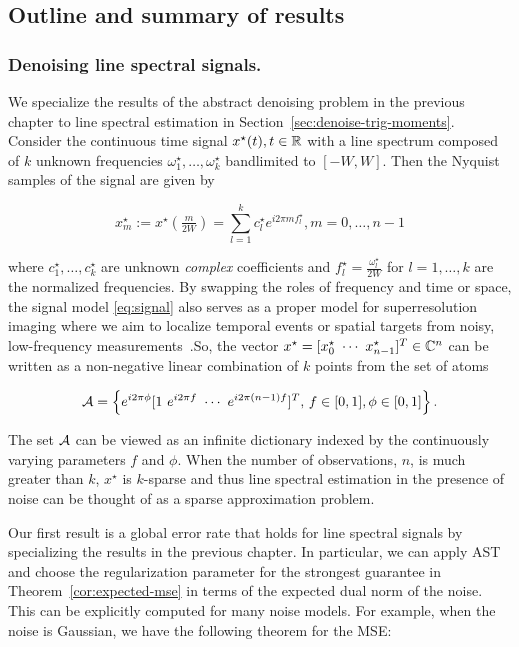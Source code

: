 \subsection{Outline and summary of results} 

\subsubsection{Denoising line spectral signals.} 

We specialize the results of the abstract denoising problem in the previous
chapter to line spectral estimation in Section~\ref{sec:denoise-trig-moments}.
Consider the continuous time signal $x^\star(t), t\in \mathbb{R}$ with a line spectrum composed of $k$ unknown frequencies $\omega_1^\star, \ldots, \omega_k^\star$ bandlimited to $[-W,W]$. Then the Nyquist samples of the signal are given by

\begin{equation}
\label{eq:signal}
 x^\star_m := x^\star\left(\tfrac{m}{2W}\right) = \sum_{l=1}^k c_l^\star e^{i 2 \pi m f_l^\star}, m = 0, \ldots, n-1
\end{equation}

where $c_1^\star, \ldots, c_k^\star$ are unknown \emph{complex} coefficients and
$f_l^\star = \tfrac{\omega_l^\star}{2W}$ for $l = 1, \ldots, k$ are the
normalized frequencies. By swapping the roles of frequency and time or space,
the signal model \eqref{eq:signal} also serves as a proper model for
superresolution imaging where we aim to localize temporal events or spatial
targets from noisy, low-frequency measurements~\cite{cg_exact12,cg_noisy}.So,
the vector $x^\star = [x^\star_0 ~ \cdots ~ x^\star_{n-1}]^T \in \mathbb{C}^n$ can be
written as a non-negative linear combination of $k$ points from the set of atoms

{\small
\[
\mathcal{A} = \left\{e^{i 2\pi \phi}[1 ~ e^{i2\pi f} ~ \cdots ~ e^{i2\pi (n-1) f}]^T,\, f \in [0,1], \phi \in [0,1] \right\}.
\]} 

The set $\mathcal{A}$ can be viewed as an infinite dictionary indexed by the continuously
varying parameters $f$ and $\phi$. When the number of observations, $n$, is much
greater than $k$, $x^\star$ is $k$-sparse and thus line spectral estimation in
the presence of noise can be thought of as a sparse approximation problem. 

Our first result is a global error rate that holds for line spectral signals by
specializing the results in the previous chapter. In particular, we can apply
AST and choose the regularization parameter for the strongest guarantee in
Theorem~\ref{cor:expected-mse} in terms of the expected dual norm of the noise.
This can be explicitly computed for many noise models. For example, when the
noise is Gaussian, we have the following theorem for the MSE:

